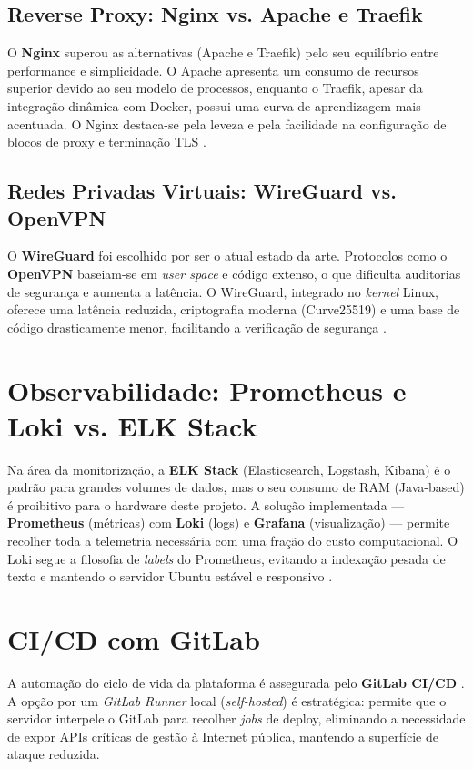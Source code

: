 \subsection{Reverse Proxy: Nginx vs. Apache e Traefik}
O \textbf{Nginx} superou as alternativas (Apache e Traefik) pelo seu equilíbrio entre performance e simplicidade. O Apache apresenta um consumo de recursos superior devido ao seu modelo de processos, enquanto o Traefik, apesar da integração dinâmica com Docker, possui uma curva de aprendizagem mais acentuada. O Nginx destaca-se pela leveza e pela facilidade na configuração de blocos de proxy e terminação TLS \cite{nginx_docs}.

\subsection{Redes Privadas Virtuais: WireGuard vs. OpenVPN}
O \textbf{WireGuard} foi escolhido por ser o atual estado da arte. Protocolos como o \textbf{OpenVPN} baseiam-se em \textit{user space} e código extenso, o que dificulta auditorias de segurança e aumenta a latência. O WireGuard, integrado no \textit{kernel} Linux, oferece uma latência reduzida, criptografia moderna (Curve25519) e uma base de código drasticamente menor, facilitando a verificação de segurança \cite{donenfeld2017wireguard}.

\section{Observabilidade: Prometheus e Loki vs. ELK Stack}


Na área da monitorização, a \textbf{ELK Stack} (Elasticsearch, Logstash, Kibana) é o padrão para grandes volumes de dados, mas o seu consumo de RAM (Java-based) é proibitivo para o hardware deste projeto. A solução implementada — \textbf{Prometheus} (métricas) com \textbf{Loki} (logs) e \textbf{Grafana} (visualização) — permite recolher toda a telemetria necessária com uma fração do custo computacional. O Loki segue a filosofia de \textit{labels} do Prometheus, evitando a indexação pesada de texto e mantendo o servidor Ubuntu estável e responsivo \cite{beyer2016sre}.

\section{CI/CD com GitLab}

A automação do ciclo de vida da plataforma é assegurada pelo \textbf{GitLab CI/CD} \cite{gitlab_cicd}. A opção por um \textit{GitLab Runner} local (\textit{self-hosted}) é estratégica: permite que o servidor interpele o GitLab para recolher \textit{jobs} de deploy, eliminando a necessidade de expor APIs críticas de gestão à Internet pública, mantendo a superfície de ataque reduzida.